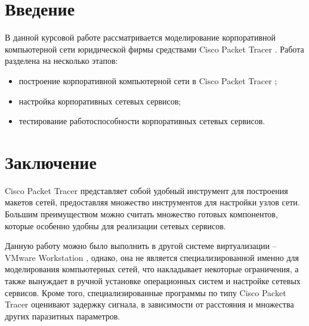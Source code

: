 


%
\tableofcontents
\clearpage

%

\chapter*{Введение}

В данной курсовой работе рассматривается моделирование корпоративной компьютерной сети юридической фирмы средствами Cisco Packet Tracer \cite{cite-cis}. Работа разделена на несколько этапов:

\begin{itemize}
	\item построение корпоративной компьютерной сети в Cisco Packet Tracer \cite{cite-cis};
	\item настройка корпоративных сетевых сервисов;
	\item тестирование работоспособности корпоративных сетевых сервисов.
\end{itemize}



\chapter*{Заключение}

Cisco Packet Tracer \cite{cite-cis} представляет собой удобный инструмент для построения макетов сетей, предоставляя множество инструментов для настройки узлов сети. Большим преимуществом можно считать множество готовых компонентов, которые особенно удобны для реализации сетевых сервисов.

Данную работу можно было выполнить в другой системе виртуализации -- VMware Workstation \cite{cite-vm}, однако, она не является специализированной именно для моделирования компьютерных сетей, что накладывает некоторые ограничения, а также вынуждает в ручной установке операционных систем и настройке сетевых сервисов. Кроме того, специализированные программы по типу Cisco Packet Tracer \cite{cite-cis} оценивают задержку сигнала, в зависимости от расстояния и множества других паразитных параметров. 


%
%






